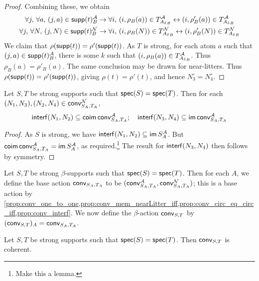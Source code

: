\begin{proof}
  Combining these, we obtain
  \begin{align*}
    \forall j,\, \forall a,\, (j, a) \in \operatorname{\mathsf{supp}}(t)_B^{\mathcal A} &\to \forall i,\, (i, \rho_B(a)) \in T_{{A_\delta}_B}^{\mathcal A} \leftrightarrow (i, \rho'_B(a)) \in T_{{A_\delta}_B}^{\mathcal A} \\
    \forall j,\, \forall N,\, (j, N) \in \operatorname{\mathsf{supp}}(t)_B^{\mathcal N} &\to \forall i,\, (i, \rho_B(N)) \in T_{{A_\delta}_B}^{\mathcal N} \leftrightarrow (i, \rho'_B(N)) \in T_{{A_\delta}_B}^{\mathcal N}
  \end{align*}
  We claim that \( \rho(\operatorname{\mathsf{supp}}(t)) = \rho'(\operatorname{\mathsf{supp}}(t)) \).
  As \( T \) is strong, for each atom \( a \) such that \( (j, a) \in \operatorname{\mathsf{supp}}(t)_B^{\mathcal A} \), there is some \( k \) such that \( (i, \rho_B(a)) \in T_{{A_\delta}_B}^{\mathcal A} \).
  Thus \( \rho_B(a) = \rho'_B(a) \).
  The same conclusion may be drawn for near-litters.
  Thus \( \rho(\operatorname{\mathsf{supp}}(t)) = \rho'(\operatorname{\mathsf{supp}}(t)) \), giving \( \rho(t) = \rho'(t) \), and hence \( N_3^\circ = N_4^\circ \).
\end{proof}
\begin{proposition}
  \label{prop:conv_interf}
  Let \( S, T \) be strong supports such that \( \operatorname{\mathsf{spec}}(S) = \operatorname{\mathsf{spec}}(T) \).
  Then for each \( (N_1, N_3), (N_2, N_4) \in \operatorname{\mathsf{conv}}_{S_A, T_A}^{\mathcal N} \),
  \[ \operatorname{\mathsf{interf}}(N_1, N_2) \subseteq \operatorname{\mathsf{coim}} \operatorname{\mathsf{conv}}_{S_A, T_A}^{\mathcal A};\quad \operatorname{\mathsf{interf}}(N_3, N_4) \subseteq \operatorname{\mathsf{im}} \operatorname{\mathsf{conv}}_{S_A, T_A}^{\mathcal A} \]
\end{proposition}
\begin{proof}
  As \( S \) is strong, we have \( \operatorname{\mathsf{interf}}(N_1, N_2) \subseteq \operatorname{\mathsf{im}} S_A^{\mathcal A} \).
  But \( \operatorname{\mathsf{coim}} \operatorname{\mathsf{conv}}_{S_A, T_A}^{\mathcal A} = \operatorname{\mathsf{im}} S_A^{\mathcal A} \), as required.\footnote{Make this a lemma.}
  The result for \( \operatorname{\mathsf{interf}}(N_3, N_4) \) then follows by symmetry.
\end{proof}
\begin{definition}
  \label{def:conv}
  Let \( S, T \) be strong \( \beta \)-supports such that \( \operatorname{\mathsf{spec}}(S) = \operatorname{\mathsf{spec}}(T) \).
  Then for each \( A \), we define the base action \( \operatorname{\mathsf{conv}}_{S_A, T_A} \) to be \( (\operatorname{\mathsf{conv}}_{S_A, T_A}^{\mathcal A}, \operatorname{\mathsf{conv}}_{S_A, T_A}^{\mathcal N}) \); this is a base action by \cref{prop:conv_one_to_one,prop:conv_mem_nearLitter_iff,prop:conv_circ_eq_circ_iff,prop:conv_interf}.
  We now define the \( \beta \)-action \( \operatorname{\mathsf{conv}}_{S,T} \) by \( (\operatorname{\mathsf{conv}}_{S,T})_A = \operatorname{\mathsf{conv}}_{S_A,T_A} \).
\end{definition}
\begin{proposition}
  \label{prop:conv_coherent}
  Let \( S, T \) be strong supports such that \( \operatorname{\mathsf{spec}}(S) = \operatorname{\mathsf{spec}}(T) \).
  Then \( \operatorname{\mathsf{conv}}_{S,T} \) is coherent.
\end{proposition}
